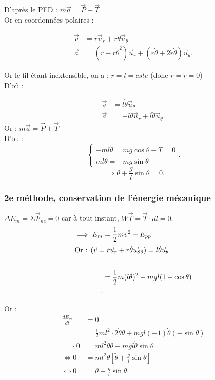 \documentclass{article}
\begin{document}
D'après le PFD : \(m\vec{a} = \vec{P}+\vec{T}\)\\
Or en coordonnées polaires : 


\begin{align*}
    \vec{v} &= \dot{r}\vec{u}_r + r\dot{\theta}\vec{u}_\theta\\
    \vec{a} &= (\ddot{r}-r\dot{\theta}^2)\vec{u}_r + (r\dot{\theta} + 2\dot{r}\dot{\theta})\vec{u}_\theta 
.\end{align*}


Or le fil étant inextensible, on a : \(r = l = cste\) (donc \(\dot{r} = \ddot{r} = 0\))\\
D'où : 

\begin{align*}
    \vec{v} &= l\dot{\theta} \vec{u}_\theta \\
    \vec{a} &= -l\dot{\theta}\vec{u}_r + l\ddot{\theta}\vec{u}_\theta 
.\end{align*}
Or : \(m\vec{a} = \vec{P}+\vec{T}\)\\
D'ou : 
\[
\begin{cases}
    -ml\dot{\theta} = mg \cos \theta -T = 0\\
    ml\ddot{\theta} = -mg\sin \theta 
\end{cases}
.\] 
\[
\implies \ddot{\theta}+\frac{g}{l}\sin \theta = 0
.\] 

\subsubsection{2e méthode, conservation de l'énergie mécanique}

\(\Delta E_m = \Sigma \vec{F}_{nc} = 0\) car à tout instant, \(W\vec{T} = \vec{T}\cdot dl = 0\).\\


\begin{align*}
   \implies E_m &= \frac{1}{2}mv^2 + E_{pp}\\
   \intertext{Or : $(\vec{v} = \dot{r}\vec{u}_r +r\dot{\theta}\vec{u_8}_\theta) = l\dot{\theta}\vec{u}_\theta $}\\
    &= \frac{1}{2}m(l\dot{\theta})^2 +mgl(1-\cos\theta) \\
.\end{align*}

Or :
\begin{align*}
    \frac{dE_m}{dt} &= 0 \\
    &= \frac{1}{2} ml^2\cdot 2\dot{\theta}\ddot{\theta}+mgl(-1)\dot{\theta}(-\sin\theta)\\
    \implies 0 &= ml^2\dot{\theta}\ddot{\theta} + mgl\dot{\theta}\sin\theta \\
    \iff 0&= ml^2\dot{\theta} \left[\ddot{\theta} +\frac{g}{l}\sin \theta \right]\\
    \iff 0&= \ddot{\theta} +\frac{g}{l}\sin\theta 
.\end{align*}
\end{document}
